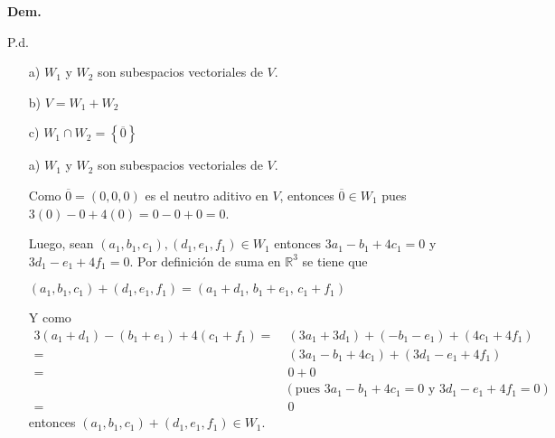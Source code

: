 \documentclass[fleqn]{article}
\begin{document}
\begin{enumerate}
        \hspace{2.7mm}\textbf{Dem.} \par

        \begin{minipage}[c]{0.7cm}
            \vspace{-1.7cm} P.d. 
        \end{minipage} \begin{minipage}[b]{9cm}
            \begin{enumerate}
                \item[a)] $ W_1 $ y $ W_2 $ son subespacios vectoriales de $ V $. 
                \item[b)] $ V = W_1 + W_2 $
                \item[c)] $ W_1 \cap W_2 = \left \{\overline{0} \right \} $
            \end{enumerate}
        \end{minipage}
        
        \begin{enumerate}
            \item[a)] $ W_1 $ y $ W_2 $ son subespacios vectoriales de $ V $. \par
            Como $ \overline{0} = (0,0,0) $ es el neutro aditivo en $ V $, entonces $ \overline{0} \in W_1 $ pues $ 3(0) - 0 + 4(0) = 0 - 0 + 0 = 0 $. \par

            Luego, sean $ (a_1,b_1,c_1), (d_1,e_1,f_1) \in W_1 $ entonces $ 3a_1 - b_1 + 4c_1 = 0 $ y $ 3d_1 - e_1 + 4f_1 = 0 $. Por definición de suma en $ \mathbb{R}^3 $ se tiene que \par

            $ (a_1,b_1,c_1) + (d_1,e_1,f_1) = (a_1+d_1, \, b_1+e_1, \, c_1+f_1) $ \par

            Y como
            \begin{align*}
                3(a_1+d_1) - (b_1+e_1) + 4(c_1+f_1) =& \; (3a_1 + 3d_1) + (- b_1 - e_1) + (4c_1 + 4f_1) \\
                =& \; (3a_1 - b_1 + 4c_1) + (3d_1 - e_1 + 4f_1) \\
                =& \; 0 + 0 \\
                & (\text{pues } 3a_1 - b_1 + 4c_1 = 0 \text{ y } 3d_1 - e_1 + 4f_1 = 0) \\
                =& \; 0
            \end{align*}
            entonces $ (a_1,b_1,c_1) + (d_1,e_1,f_1) \in W_1 $.


\end{enumerate}
\end{enumerate}
\end{document}
